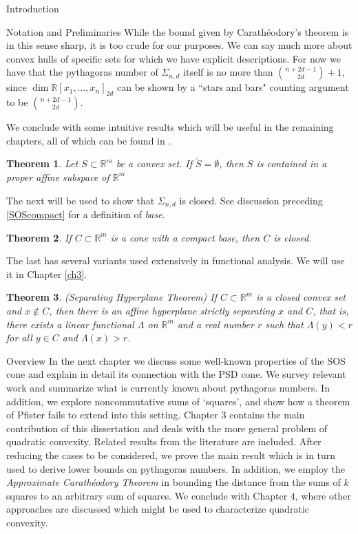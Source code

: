 \documentclass[12pt,oneside,final]{ucthesisucsbmath2010}
\newcommand{\R}{\mathbb{R}}
\newcommand{\snd}{\Sigma_{n,d}}
\newcommand{\pnd}{\R[x_1,\ldots,x_n]_{2d}}
\newtheorem{thm}{Theorem}[section]
\theoremstyle{definition}
\begin{document}
\begin{chapter}{Introduction}
\begin{section}{Notation and Preliminaries}
While the bound given by Carath\'{e}odory's theorem is in this sense sharp, it is too crude for our purposes. We can say much more about convex hulls of specific sets for which we have explicit descriptions. For now we have that the pythagoras number of $\snd$ itself is no more than $\binom{n+2d-1}{2d}+1$, since $\dim \pnd$ can be shown by a ``stars and bars" counting argument to be $\binom{n+2d-1}{2d}$.

We conclude with some intuitive results which will be useful in the remaining chapters, all of which can be found in \cite{Barvinok}.

\begin{thm}
Let $S\subset \R^m$ be a convex set. If $\mathring{S} = \emptyset$, then $S$ is contained in a proper affine subspace of $\R^m$
\label{fatconvex}
\end{thm}

The next will be used to show that $\snd$ is closed. See discussion preceding \ref{SOScompact} for a definition of \emph{base}.

\begin{thm}If $C\subset \R^m$ is a cone with a compact base, then $C$ is closed.
\label{KCone}
\end{thm}

The last has several variants used extensively in functional analysis. We will use it in Chapter \ref{ch3}.

\begin{thm}(Separating Hyperplane Theorem) If $C\subset \R^m$ is a closed convex set and $x \notin C$, then there is an affine hyperplane strictly separating $x$ and $C$, that is, there exists a linear functional $\Lambda$ on $\R^m$ and a real number $r$ such that $\Lambda(y) < r$ for all $y\in C$ and $\Lambda(x) > r$.
\label{Separation}
\end{thm}

\end{section}

\begin{section}{Overview}
In the next chapter we discuss some well-known properties of the SOS cone and explain in detail its connection with the PSD cone. We survey relevant work and summarize what is currently known about pythagoras numbers. In addition, we explore noncommutative sums of `squares', and show how a theorem of Pfister fails to extend into this setting. Chapter $3$ contains the main contribution of this dissertation and deals with the more general problem of quadratic convexity. Related results from the literature are included. After reducing the cases to be considered, we prove the main result which is in turn used to derive lower bounds on pythagoras numbers. In addition, we employ the \emph{Approximate Carath\'{e}odory Theorem} in bounding the distance from the sums of $k$ squares to an arbitrary sum of squares. We conclude with Chapter $4$, where other approaches are discussed which might be used to characterize quadratic convexity.
\end{section}

\label{ch1}
\end{chapter}
\end{document}
